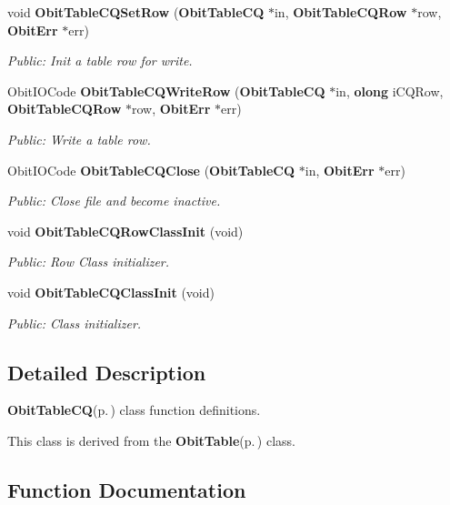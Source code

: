 \begin{CompactItemize}
void {\bf Obit\-Table\-CQSet\-Row} ({\bf Obit\-Table\-CQ} $\ast$in, {\bf Obit\-Table\-CQRow} $\ast$row, {\bf Obit\-Err} $\ast$err)
\begin{CompactList}\small\item\em Public: Init a table row for write. \item\end{CompactList}\item 
Obit\-IOCode {\bf Obit\-Table\-CQWrite\-Row} ({\bf Obit\-Table\-CQ} $\ast$in, {\bf olong} i\-CQRow, {\bf Obit\-Table\-CQRow} $\ast$row, {\bf Obit\-Err} $\ast$err)
\begin{CompactList}\small\item\em Public: Write a table row. \item\end{CompactList}\item 
Obit\-IOCode {\bf Obit\-Table\-CQClose} ({\bf Obit\-Table\-CQ} $\ast$in, {\bf Obit\-Err} $\ast$err)
\begin{CompactList}\small\item\em Public: Close file and become inactive. \item\end{CompactList}\item 
void {\bf Obit\-Table\-CQRow\-Class\-Init} (void)
\begin{CompactList}\small\item\em Public: Row Class initializer. \item\end{CompactList}\item 
void {\bf Obit\-Table\-CQClass\-Init} (void)
\begin{CompactList}\small\item\em Public: Class initializer. \item\end{CompactList}\end{CompactItemize}


\subsection{Detailed Description}
{\bf Obit\-Table\-CQ}{\rm (p.\,\pageref{structObitTableCQ})} class function definitions. 

This class is derived from the {\bf Obit\-Table}{\rm (p.\,\pageref{structObitTable})} class.

\subsection{Function Documentation}
